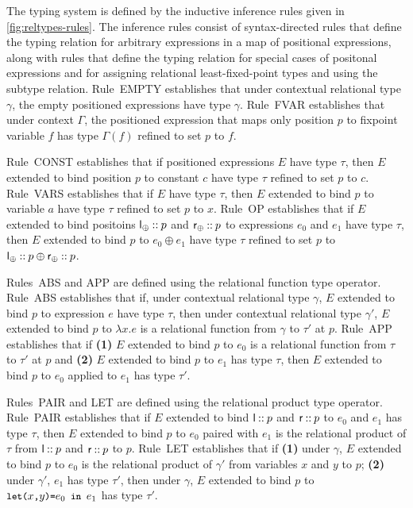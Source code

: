 The typing system is defined by the inductive inference rules given in
\autoref{fig:reltypes-rules}.
%
The inference rules consist of syntax-directed rules that define the
typing relation for arbitrary expressions in a map of positional
expressions, along with rules that define the typing relation for
special cases of positonal expressions and for assigning relational
least-fixed-point types and using the subtype relation.
Rule~EMPTY establishes that under contextual relational type $\gamma$,
the empty positioned expressions have type $\gamma$.
Rule~FVAR establishes that under context $\Gamma$, the positioned
expression that maps only position $p$ to fixpoint variable $f$ has
type $\Gamma(f)$ refined to set $p$ to $f$.

Rule~CONST establishes that if positioned expressions $E$ have type
$\tau$, then $E$ extended to bind position $p$ to constant $c$ have
type $\tau$ refined to set $p$ to $c$.
Rule~VARS establishes that if $E$ have type $\tau$, then $E$ extended
to bind $p$ to variable $a$ have type $\tau$ refined to set $p$ to
$x$.
Rule~OP establishes that if $E$ extended to bind positoins
$\mathsf{l}_{\oplus} \mathbin{::} p$ and $\mathsf{r}_{\oplus} \mathbin{::} p$ to expressions
$e_0$ and $e_1$ have type $\tau$, then $E$ extended to bind $p$ to
$e_0 \oplus e_1$ have type $\tau$ refined to set $p$ to
$\mathsf{l}_{\oplus} \mathbin{::} p \oplus \mathsf{r}_{\oplus} \mathbin{::} p$.

Rules~ABS and APP are defined using the relational function type
operator.
%
Rule~ABS establishes that if, under contextual relational type
$\gamma$, $E$ extended to bind $p$ to expression $e$ have type $\tau$,
then under contextual relational type $\gamma'$, $E$ extended to bind
$p$ to $\lambda x. e$ is a relational function from $\gamma$ to
$\tau'$ at $p$.
Rule~APP establishes that if %
\textbf{(1)} $E$ extended to bind $p$ to $e_0$ is a relational
function from $\tau$ to $\tau'$ at $p$ and %
\textbf{(2)} $E$ extended to bind $p$ to $e_1$ has type $\tau$, then
$E$ extended to bind $p$ to $e_0$ applied to $e_1$ has type $\tau'$.

Rules~PAIR and LET are defined using the relational product type
operator.
Rule~PAIR establishes that if $E$ extended to bind
$\mathsf{l} \mathbin{::} p$ and $\mathsf{r} \mathbin{::} p$ to $e_0$ and $e_1$ has
type $\tau$, then $E$ extended to bind $p$ to $e_0$ paired with $e_1$
is the relational product of $\tau$ from $\mathsf{l} \mathbin{::} p$ and
$\mathsf{r} \mathbin{::} p$ to $p$.
Rule~LET establishes that if %
\textbf{(1)} under $\gamma$, $E$ extended to bind $p$ to $e_0$ is the
relational product of $\gamma'$ from variables $x$ and $y$ to $p$;
%
\textbf{(2)} under $\gamma'$, $e_1$ has type $\tau'$, then under
$\gamma$, $E$ extended to bind $p$ to $\letexp{x}{y}{e_0}{e_1}$ has
type $\tau'$.

